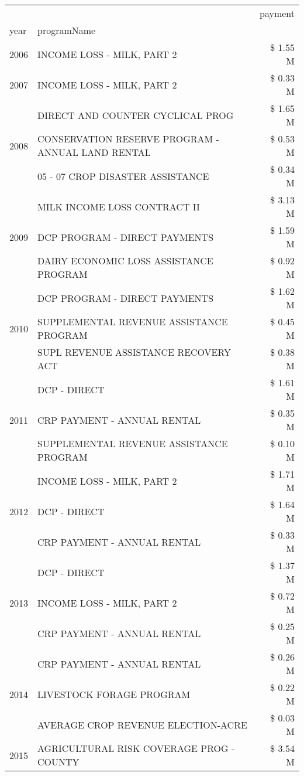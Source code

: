 \begin{tabular}{llr}
\toprule
 &  & payment \\
year & programName &  \\
\midrule
2006 & INCOME LOSS - MILK, PART 2 & \$ 1.55 M \\
\cline{1-3}
2007 & INCOME LOSS - MILK, PART 2 & \$ 0.33 M \\
\cline{1-3}
\multirow[t]{3}{*}{2008} & DIRECT AND COUNTER CYCLICAL PROG & \$ 1.65 M \\
 & CONSERVATION RESERVE PROGRAM - ANNUAL LAND RENTAL & \$ 0.53 M \\
 & 05 - 07 CROP DISASTER ASSISTANCE & \$ 0.34 M \\
\cline{1-3}
\multirow[t]{3}{*}{2009} & MILK INCOME LOSS CONTRACT II & \$ 3.13 M \\
 & DCP PROGRAM - DIRECT PAYMENTS & \$ 1.59 M \\
 & DAIRY ECONOMIC LOSS ASSISTANCE PROGRAM & \$ 0.92 M \\
\cline{1-3}
\multirow[t]{3}{*}{2010} & DCP PROGRAM - DIRECT PAYMENTS & \$ 1.62 M \\
 & SUPPLEMENTAL REVENUE ASSISTANCE PROGRAM & \$ 0.45 M \\
 & SUPL REVENUE ASSISTANCE RECOVERY ACT & \$ 0.38 M \\
\cline{1-3}
\multirow[t]{3}{*}{2011} & DCP - DIRECT & \$ 1.61 M \\
 & CRP PAYMENT - ANNUAL RENTAL & \$ 0.35 M \\
 & SUPPLEMENTAL REVENUE ASSISTANCE PROGRAM & \$ 0.10 M \\
\cline{1-3}
\multirow[t]{3}{*}{2012} & INCOME LOSS - MILK, PART 2 & \$ 1.71 M \\
 & DCP - DIRECT & \$ 1.64 M \\
 & CRP PAYMENT - ANNUAL RENTAL & \$ 0.33 M \\
\cline{1-3}
\multirow[t]{3}{*}{2013} & DCP - DIRECT & \$ 1.37 M \\
 & INCOME LOSS - MILK, PART 2 & \$ 0.72 M \\
 & CRP PAYMENT - ANNUAL RENTAL & \$ 0.25 M \\
\cline{1-3}
\multirow[t]{3}{*}{2014} & CRP PAYMENT - ANNUAL RENTAL & \$ 0.26 M \\
 & LIVESTOCK FORAGE PROGRAM & \$ 0.22 M \\
 & AVERAGE CROP REVENUE ELECTION-ACRE & \$ 0.03 M \\
\cline{1-3}
\multirow[t]{3}{*}{2015} & AGRICULTURAL RISK COVERAGE PROG - COUNTY & \$ 3.54 M \\

\end{tabular}
